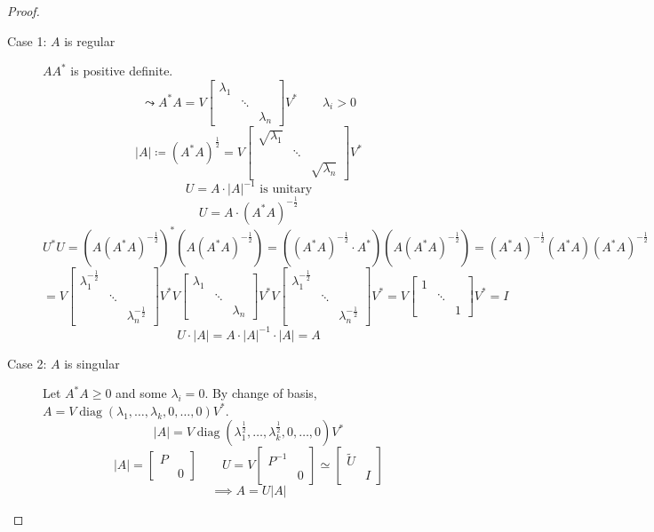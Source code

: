 \documentclass{article}
\newcommand{\card}[1]{\left|#1\right|}
\begin{document}
\begin{proof}
  \begin{description}
    \item[Case 1: $A$ is regular]
      $A A^*$ is positive definite.
      \[ \leadsto A^* A = V \begin{bmatrix} \lambda_1 & &  \\ & \ddots & \\ & & \lambda_n \end{bmatrix} V^* \qquad \lambda_i > 0 \]
      \[ \card{A} \coloneqq (A^* A)^{\frac12} = V \begin{bmatrix} \sqrt{\lambda_1} & &  \\ & \ddots & \\ & & \sqrt{\lambda_n} \end{bmatrix} V^* \]
      \[ U = A \cdot \card{A}^{-1} \text{ is unitary} \]
      \[ U = A \cdot (A^* A)^{-\frac12} \]
      \[ U^* U = (A(A^* A)^{-\frac12})^* (A (A^* A)^{-\frac12}) = ((A^* A)^{-\frac12} \cdot A^*) (A (A^* A)^{-\frac12}) = (A^* A)^{-\frac12} (A^* A) (A^* A)^{-\frac12} \]
      \[ = V \begin{bmatrix} \lambda_1^{-\frac12} & & \\ & \ddots & \\ & & \lambda_n^{-\frac12} \end{bmatrix} V^* V \begin{bmatrix} \lambda_1 & & \\ & \ddots & \\ & & \lambda_n \end{bmatrix} V^* V \begin{bmatrix} \lambda_1^{-\frac12} & & \\ & \ddots & \\ & & \lambda_n^{-\frac12} \end{bmatrix} V^* = V \begin{bmatrix} 1 & & \\ & \ddots & \\ & & 1 \end{bmatrix} V^* = I \]
      \[ U \cdot \card{A} = A \cdot \card{A}^{-1} \cdot \card{A} = A \]
    \item[Case 2: $A$ is singular]
      Let $A^* A \geq 0$ and some $\lambda_i = 0$.
      By change of basis, $A = V \operatorname{diag}(\lambda_1, \dots, \lambda_k, 0, \dots, 0) V^*$.
      \[ \card{A} = V \operatorname{diag}(\lambda_1^{\frac12}, \dots, \lambda_k^{\frac12}, 0, \dots, 0) V^* \]
      \[ \card{A} = \begin{bmatrix} P & \\ & 0 \end{bmatrix} \qquad U = V \begin{bmatrix} P^{-1} & \\ & 0 \end{bmatrix} \simeq \begin{bmatrix} \tilde U & \\ & I \end{bmatrix} \]
      \[ \implies A = U \card{A} \]
  \end{description}
\end{proof}
\end{document}
